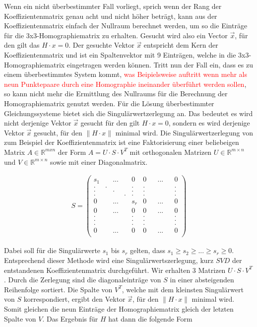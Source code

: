 Wenn ein nicht überbestimmter Fall vorliegt, sprich wenn der Rang der Koeffizientenmatrix genau acht und nicht höher beträgt, kann aus der Koeffizientenmatrix einfach der Nullraum berechnet werden, um so die Einträge für die 3x3-Homographiematrix zu erhalten\cite{HZ,Elements,Schwarz}. Gesucht wird also ein Vector $\vec{x}$, für den gilt das $H \cdot x = 0$. Der gesuchte Vektor $\vec{x}$ entspricht dem Kern der Koeffizientenmatrix und ist ein Spaltenvektor mit 9 Einträgen, welche in die 3x3-Homographiematrix eingetragen werden können\cite{HZ,Schwarz}. Tritt nun der Fall ein, dass es zu einem überbestimmtes System kommt, \textcolor{red}{was Beipielsweise auftritt wenn mehr als neun Punktepaare durch eine Homographie ineinander überführt werden sollen}, so kann nicht mehr die Ermittlung des Nullraums für die Berechnung der Homographiematrix genutzt werden. Für die Lösung überbestimmter Gleichungssysteme bietet sich die Singulärwertzerlegung an\cite{HZ}\cite{Scholz}. Das bedeutet es wird nicht derjenige Vektor $\vec{x}$ gesucht für den gilt $H \cdot x = 0$, sondern es wird derjenige Vektor $\vec{x}$ gesucht, für den \ensuremath{\parallel H \cdot x\parallel} minimal wird\cite{HZ,Schwarz}. Die Singulärwertzerlegung von zum Beispiel der Koeffizientenmatrix ist eine Faktorisierung einer beliebeigen Matrix \ensuremath{A \in \mathbb{R}^{mxn}} der Form \ensuremath{A = U \cdot S \cdot V^T} mit orthogonalen Matrizen \ensuremath{U \in \mathbb{R}^{m \times n}} und \ensuremath{V \in \mathbb{R}^{m \times n}} sowie mit einer Diagonalmatrix. 

\begin{gather}
	S = \begin{pmatrix}
	s_1&&...&&0&0&&...&&0\\
	.&.&&&.&.&&&&.\\
	.&&.&&.&.&&&&.\\
	.&&&.&.&.&&&&.\\
	0&&...&&s_r&0&&...&&0\\	
	0&&...&&0&0&&...&&0\\
	.&&&&.&.&&&&.\\
	.&&&&.&.&&&&.\\	
	.&&&&.&.&&&&.\\	
	0&&...&&0&0&&...&&0\\	
	\end{pmatrix}
\end{gather}

Dabei soll für die Singulärwerte $s_1$ bis $s_r$ gelten, dass \ensuremath{s_1 \geq s_2 \geq ... \geq s_r \ge 0 }\cite{Scholz}. Entsprechend dieser Methode wird eine Singulärwertszerlegung, kurz $SVD$ der entstandenen Koeffizientenmatrix durchgeführt. Wir erhalten 3 Matrizen $U \cdot S\cdot V^T$. Durch die Zerlegung sind die diagonaleinträge von $S$ in einer absteigenden Reihenfolge sortiert. Die Spalte von $V^T$, welche mit dem kleinsten Singulärwert von $S$ korrespondiert, ergibt den Vektor $\vec{x}$, für den \ensuremath{\parallel H \cdot x\parallel} minimal wird. Somit gleichen die neun Einträge der Homographiematrix gleich der letzten Spalte von $V$. Das Ergebnis für $H$ hat dann die folgende Form

